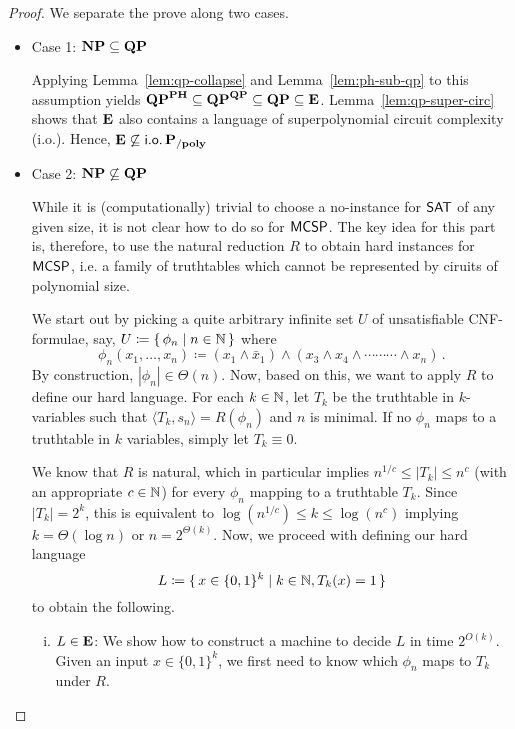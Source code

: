\documentclass[11pt]{article}
\begin{document}
\begin{proof}
  We separate the prove along two cases.
	\begin{itemize}
		\item Case 1: $\mathbf{NP} \subseteq \mathbf{QP}$

      Applying Lemma~\ref{lem:qp-collapse} and Lemma~\ref{lem:ph-sub-qp} to
      this assumption yields
      $\mathbf{QP}^{\mathbf{PH}} \subseteq \mathbf{QP}^{\mathbf{QP}} \subseteq
       \mathbf{QP} \subseteq \mathbf{E}$.
      Lemma~\ref{lem:qp-super-circ} shows that $\mathbf{E}$ also contains
      a language of superpolynomial circuit complexity (i.o.).
      Hence, $\mathbf{E} \not\subseteq \mathsf{i.o.}\,\mathbf{P_{/poly}}$\\
		
		\item Case 2: $\mathbf{NP} \not\subseteq \mathbf{QP}$

      While it is (computationally) trivial to choose a no-instance for $\mathsf{SAT}$
      of any given size, it is not clear how to do so for $\mathsf{MCSP}$.
      The key idea for this part is, therefore, to use the natural reduction $R$
      to obtain hard instances for $\mathsf{MCSP}$, i.e. a family of
      truthtables which cannot be represented by ciruits of polynomial size.

      We start out by picking a quite arbitrary infinite set $U$ of 
      unsatisfiable CNF-formulae, say,
      $U \coloneqq \{\, { \phi_n \mid n \in {\mathbb{N}} } \,\}$
      where
      \[
        \phi_n(x_1, \dots, x_n) \coloneqq
        (x_1 \land \bar x_1) \land
        (x_3 \land x_4 \land \cdots \cdots \cdots \land x_n) \,.
      \]
      By construction, $|\phi_n| \in \Theta(n)$.
      Now, based on this, we want to apply $R$ to define our hard language.
      For each $k \in {\mathbb{N}}$, let $T_k$ be the truthtable in $k$-variables such
      that $\langle T_k, s_n \rangle = R(\phi_n)$ and $n$ is minimal.
      If no $\phi_n$ maps to a truthtable in $k$ variables, simply let
      $T_k \equiv 0$.

      We know that $R$ is natural, which in particular implies
      $n^{1/c} \le |T_k| \le n^c$ (with an appropriate $c \in {\mathbb{N}}$)
      for every $\phi_n$ mapping to a truthtable $T_k$.
      Since $|T_k| = 2^k$, this is equivalent to
      $\log (n^{1/c}) \le k \le \log (n^c)$
      implying $k = \Theta(\log n)$ or $n = 2^{\Theta(k)}$.
      Now, we proceed with defining our hard language
      \[
        L \coloneqq
        \{\, {
          x \in \{0,1\}^k \mid
          k \in {\mathbb{N}},
          T_k(x) = 1
        } \,\}
      \]
      to obtain the following.
      \begin{enumerate}[(i)]
        \item $L \in \mathbf{E}$:
          We show how to construct a machine to decide $L$ in time
          $2^{O(k)}$.
          Given an input $x \in \{0,1\}^k$, we first need to know which
          $\phi_n$ maps to $T_k$ under $R$.


\end{enumerate}
\end{itemize}
\end{proof}
\end{document}
